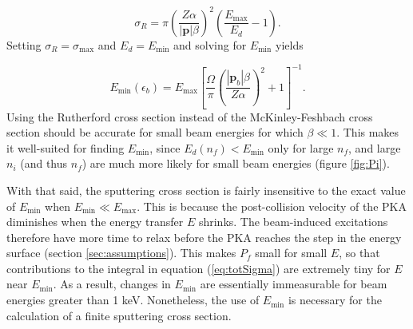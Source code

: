 \documentclass{article}
\begin{document}
\begin{equation}
  \sigma_R
  =
  \pi\left(\frac{Z\alpha}{|\mathbf{p}|\beta}\right)^2
  \left(\frac{E_\text{max}}{E_d} - 1\right).
  \label{eq:Rutherford}
\end{equation}
%
Setting $\sigma_R=\sigma_\text{max}$ and $E_d=E_\text{min}$ and solving for
$E_\text{min}$ yields

\begin{equation}
  E_\text{min}(\epsilon_b)
  =
  E_\text{max}
  \left[\frac{\Omega}{\pi}
    \left(\frac{|\mathbf{p}_b|\beta}{Z\alpha}\right)^2 + 1
  \right]^{-1}.
  \label{eq:Emin}
\end{equation}
%
Using the Rutherford cross section instead of the McKinley-Feshbach
cross section should be accurate for small beam energies for which $\beta\ll
1$.
This makes it well-suited for finding $E_\text{min}$, since
$E_d(n_f)<E_\text{min}$ only for large $n_f$, and large $n_i$ (and thus $n_f$)
are much more likely for small beam energies (figure \ref{fig:Pi}).

With that said, the sputtering cross section is fairly insensitive to the exact
value of $E_\text{min}$ when $E_\text{min} \ll E_\text{max}$.
This is because the post-collision velocity of the PKA diminishes when the
energy transfer $E$ shrinks.
The beam-induced excitations therefore have more time to relax before the PKA
reaches the step in the energy surface (section \ref{sec:assumptions}).
This makes $P_f$ small for small $E$, so that contributions to the integral in
equation (\ref{eq:totSigma}) are extremely tiny for $E$ near $E_\text{min}$.
As a result, changes in $E_\text{min}$ are essentially immeasurable for beam
energies greater than 1 keV.
Nonetheless, the use of $E_\text{min}$ is necessary for the calculation of a
finite sputtering cross section.




\end{document}
